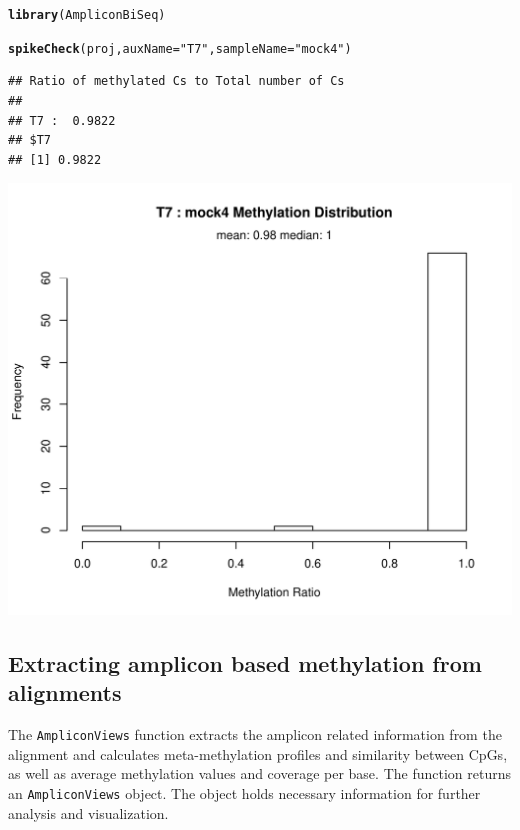 \documentclass{article}\usepackage[]{graphicx}\usepackage[]{color}
\makeatletter
\newcommand{\hlstr}[1]{\textcolor[rgb]{0.192,0.494,0.8}{#1}}%
\newcommand{\hlstd}[1]{\textcolor[rgb]{0.345,0.345,0.345}{#1}}%
\newcommand{\hlkwc}[1]{\textcolor[rgb]{0.333,0.667,0.333}{#1}}%
\newcommand{\hlkwd}[1]{\textcolor[rgb]{0.737,0.353,0.396}{\textbf{#1}}}%
\newenvironment{kframe}{%
 \def\at@end@of@kframe{}%
 \ifinner\ifhmode%
  \def\at@end@of@kframe{\end{minipage}}%
  \begin{minipage}{\columnwidth}%
 \fi\fi%
 \def\FrameCommand##1{\hskip\@totalleftmargin \hskip-\fboxsep
 \colorbox{shadecolor}{##1}\hskip-\fboxsep
     \hskip-\linewidth \hskip-\@totalleftmargin \hskip\columnwidth}%
 \MakeFramed {\advance\hsize-\width
   \@totalleftmargin\z@ \linewidth\hsize
   \@setminipage}}%
 {\par\unskip\endMakeFramed%
 \at@end@of@kframe}
\newenvironment{knitrout}{}{} %
\makeatother
\begin{document}
\begin{knitrout}
\color{fgcolor}\begin{kframe}
\begin{alltt}
\hlkwd{library}\hlstd{(AmpliconBiSeq)}
\end{alltt}


{\ttfamily\noindent\itshape{}}\begin{alltt}
\hlkwd{spikeCheck}\hlstd{(proj,} \hlkwc{auxName} \hlstd{=} \hlstr{"T7"}\hlstd{,} \hlkwc{sampleName} \hlstd{=} \hlstr{"mock4"}\hlstd{)}
\end{alltt}
\begin{verbatim}
## Ratio of methylated Cs to Total number of Cs
## 
## T7 :  0.9822
## $T7
## [1] 0.9822
\end{verbatim}
\end{kframe}

{\centering \includegraphics[width=.9\linewidth]{figure/manual-spikeCheck1} 

}



\end{knitrout}



\subsection{Extracting amplicon based methylation from alignments}
The \texttt{AmpliconViews} function extracts the amplicon related information from
the alignment and calculates meta-methylation profiles and similarity between CpGs, 
as well as average methylation values and coverage per base. The function returns
an \texttt{AmpliconViews} object. The object holds necessary information for further
analysis and visualization.
\end{document}

